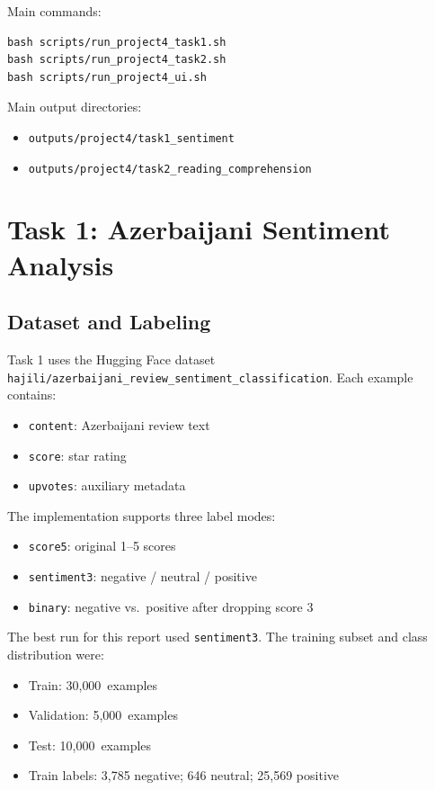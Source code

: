 \documentclass[11pt]{article}
\newcommand{\taskOneTrain}{30{,}000}
\newcommand{\taskOneVal}{5{,}000}
\newcommand{\taskOneTest}{10{,}000}
\begin{document}
Main commands:
\begin{verbatim}
bash scripts/run_project4_task1.sh
bash scripts/run_project4_task2.sh
bash scripts/run_project4_ui.sh
\end{verbatim}

Main output directories:
\begin{itemize}
    \item \texttt{outputs/project4/task1\_sentiment}
    \item \texttt{outputs/project4/task2\_reading\_comprehension}
\end{itemize}

\section{Task 1: Azerbaijani Sentiment Analysis}
\subsection{Dataset and Labeling}
Task 1 uses the Hugging Face dataset \texttt{hajili/azerbaijani\_review\_sentiment\_classification}. Each example contains:
\begin{itemize}
    \item \texttt{content}: Azerbaijani review text
    \item \texttt{score}: star rating
    \item \texttt{upvotes}: auxiliary metadata
\end{itemize}

The implementation supports three label modes:
\begin{itemize}
    \item \texttt{score5}: original 1--5 scores
    \item \texttt{sentiment3}: negative / neutral / positive
    \item \texttt{binary}: negative vs.\ positive after dropping score 3
\end{itemize}

The best run for this report used \texttt{sentiment3}. The training subset and class distribution were:
\begin{itemize}
    \item Train: \taskOneTrain\ examples
    \item Validation: \taskOneVal\ examples
    \item Test: \taskOneTest\ examples
    \item Train labels: 3,785 negative; 646 neutral; 25,569 positive
\end{itemize}
\end{document}

